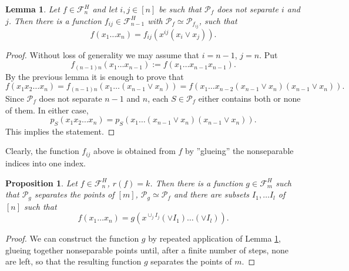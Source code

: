 \documentclass[12pt]{article}
\newtheorem{lemma}{Lemma}
\newtheorem{prop}{Proposition}
\theoremstyle{definition}
\theoremstyle{remark}
\def\Pe{\mathcal P}
\def\Fe{\mathcal F}
\begin{document}
\begin{lemma}\label{lemma:separateij}
Let $f\in \Fe_n^H$ and let $i,j\in [n]$ be such that $\Pe_f$ does not separate $i$ and
$j$. Then there is a function $f_{ij}\in \Fe_{n-1}^H$ with $\Pe_f\simeq \Pe_{f_{ij}}$, such that 
\[
f(x_1\dots x_n)=f_{ij}(x^{ij}(x_i\vee x_j)).
\]

\end{lemma}

\begin{proof} Without loss of generality we may assume that $i=n-1$, $j=n$. Put 
\[
f_{(n-1)n}(x_1\dots x_{n-1}):=f(x_1\dots x_{n-1}x_{n-1}).
\]
By the previous lemma it is enough to prove that 
\[
f(x_1x_2\dots x_n)=f_{(n-1)n}(x_1\dots (x_{n-1}\vee x_n))=f(x_1\dots x_{n-2}(x_{n-1}\vee
x_n)(x_{n-1}\vee
x_n)).
\]
Since $\Pe_f$ does not separate $n-1$ and $n$, each $S\in \Pe_f$ either contains both or
none of them. In either case,
\[
p_S(x_1x_2\dots x_n)=p_S(x_1\dots (x_{n-1}\vee x_n)(x_{n-1}\vee x_n)).
\]
This implies the statement.


\end{proof}

Clearly, the function $f_{ij}$ above is obtained from $f$ by ''glueing''  the
nonseparable indices into one index.

\begin{prop}\label{prop:separates} Let $f\in \Fe_n^H$, $r(f)=k$. Then there is a function
$g\in \Fe_{m}^H$ such that $\Pe_g$ separates the points of $[m]$, $\Pe_g\simeq \Pe_f$  and there are subsets
$I_1,\dots I_l$ of $[n]$ such that 
\[
f(x_1\dots x_n)=g(x^{\cup_j I_j}(\vee I_1)\dots (\vee I_l)).
\]


\end{prop}
\begin{proof} We can construct the function $g$ by repeated application of Lemma
\ref{lemma:separateij}, glueing together nonseparable points until, after a finite number
of steps, none are left, so that the resulting function $g$ separates the points of $m$.

\end{proof}
\end{document}
